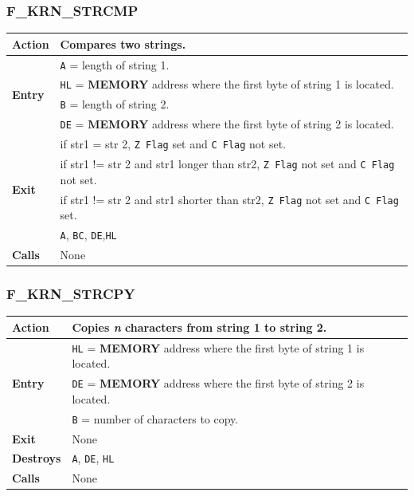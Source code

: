 \documentclass[a4paper,11pt]{article}
\begin{document}
        \subsubsection{F\_KRN\_STRCMP}
        \label{func:fkrnstrcmp}
        \begin{tabular}{l p{9cm}}
            \hline\textbf{Action}
            & Compares two strings.\\
            \hline\multirow[t]{4}{4em}{\textbf{Entry}}
            & \texttt{A} = length of string 1.\\
            & \texttt{HL} = \textbf{MEMORY} address where the first byte of
            string 1 is located.\\
            & \texttt{B} = length of string 2.\\
            & \texttt{DE} = \textbf{MEMORY} address where the first byte of
            string 2 is located.\\
            \hline\multirow[t]{4}{4em}{\textbf{Exit}}
            & if str1 = str 2, \texttt{Z Flag} set and \texttt{C Flag} not set.\\
            & if str1 != str 2 and str1 longer than str2, \texttt{Z Flag} not 
            set and \texttt{C Flag} not set.\\
            & if str1 != str 2 and str1 shorter than str2, \texttt{Z Flag} not 
            set and \texttt{C Flag} set.\\
            \hline\textbf{Destroys} & \texttt{A}, \texttt{BC}, \texttt{DE},\texttt{HL} \\
            \hline\textbf{Calls} & None\\
            \hline
        \end{tabular}

        \subsubsection{F\_KRN\_STRCPY}
        \label{func:fkrnstrcpy}
        \begin{tabular}{l p{9cm}}
            \hline\textbf{Action}
            & Copies \textit{n} characters from string 1 to string 2.\\
            \hline\multirow[t]{3}{4em}{\textbf{Entry}}
            & \texttt{HL} = \textbf{MEMORY} address where the first byte of
            string 1 is located.\\
            & \texttt{DE} = \textbf{MEMORY} address where the first byte of
            string 2 is located.\\
            & \texttt{B} = number of characters to copy.\\
            \hline\textbf{Exit} & None\\
            \hline\textbf{Destroys} & \texttt{A}, \texttt{DE}, \texttt{HL}\\
            \hline\textbf{Calls} & None\\
            \hline
        \end{tabular}
\end{document}
